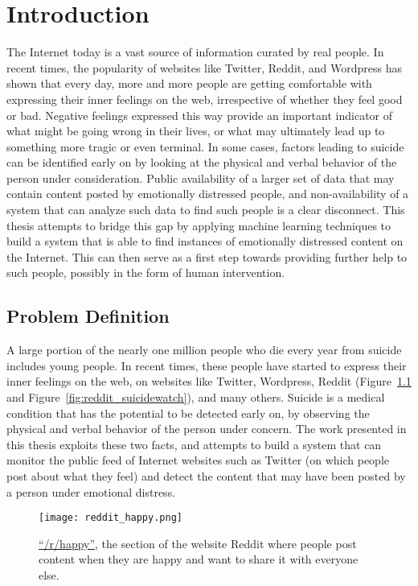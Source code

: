 \chapter{Introduction}
\label{chapter:Introduction}

The Internet today is a vast source of information curated by real people. In recent times, the popularity of websites like Twitter, Reddit, and Wordpress has shown that every day, more and more people are getting comfortable with expressing their inner feelings on the web, irrespective of whether they feel good or bad. Negative feelings expressed this way provide an important indicator of what might be going wrong in their lives, or what may ultimately lead up to something more tragic or even terminal. In some cases, factors leading to suicide can be identified early on by looking at the physical and verbal behavior of the person under consideration. Public availability of a larger set of data that may contain content posted by emotionally distressed people, and non-availability of a system that can analyze such data to find such people is a clear disconnect. This thesis attempts to bridge this gap by applying machine learning techniques to build a system that is able to find instances of emotionally distressed content on the Internet. This can then serve as a first step towards providing further help to such people, possibly in the form of human intervention.

\section{Problem Definition}
A large portion of the nearly one million people who die every year from suicide includes young people. In recent times, these people have started to express their inner feelings on the web, on websites like Twitter, Wordpress, Reddit (Figure~\ref{fig:reddit_happy} and Figure~\ref{fig:reddit_suicidewatch}), and many others. Suicide is a medical condition that has the potential to be detected early on, by observing the physical and verbal behavior of the person under concern. The work presented in this thesis exploits these two facts, and attempts to build a system that can monitor the public feed of Internet websites such as Twitter (on which people post about what they feel) and detect the content that may have been posted by a person under emotional distress.\\

\begin{figure}[t!]
    \centering
    \texttt{[image: reddit\_happy.png]}
    \caption{\href{http://www.reddit.com/r/happy}{``/r/happy''}, the section of the website Reddit \cite{reddit} where people post content when they are happy and want to share it with everyone else.}
    \label{fig:reddit_happy}
\end{figure}


